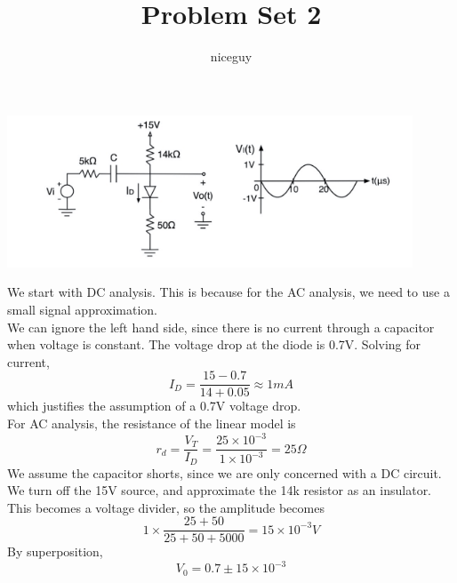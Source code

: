 \documentclass[answers]{exam}
\title{Problem Set 2}
\author{niceguy}
\begin{document}
\maketitle

\begin{questions}


\begin{center}
\includegraphics{q1.png}
\end{center}

\begin{solution}
    We start with DC analysis. This is because for the AC analysis, we need to use a small signal approximation. \\
    We can ignore the left hand side, since there is no current through a capacitor when voltage is constant. The voltage drop at the diode is 0.7V. Solving for current,
    $$I_D = \frac{15 - 0.7}{14 + 0.05} \approx 1\unit{mA}$$
    which justifies the assumption of a 0.7V voltage drop. \\
    For AC analysis, the resistance of the linear model is
    $$r_d = \frac{V_T}{I_D} = \frac{25 \times 10^{-3}}{1 \times 10^{-3}} = 25\unit{\Omega}$$
    We assume the capacitor shorts, since we are only concerned with a DC circuit. We turn off the 15V source, and approximate the 14k resistor as an insulator. This becomes a voltage divider, so the amplitude becomes
    $$1 \times \frac{25 + 50}{25 + 50 + 5000} = 15 \times 10^{-3}\unit{V}$$
    By superposition,
    $$V_0 = 0.7 \pm 15 \times 10^{-3}$$
\end{solution}



\end{questions}
\end{document}
